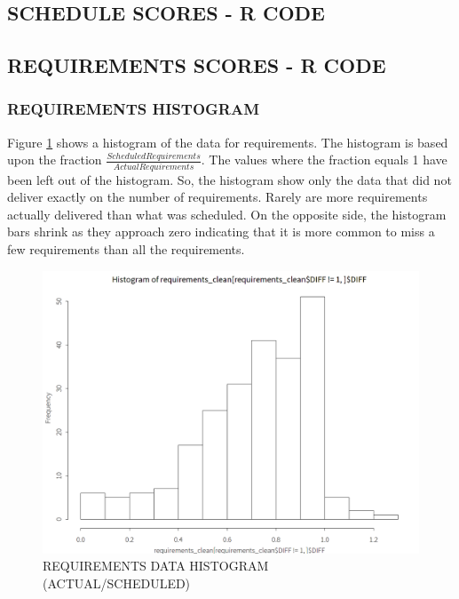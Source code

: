 \documentclass[SDSUThesis.tex]{subfiles}
\begin{document}
    \subsection{SCHEDULE SCORES - R CODE}
        
        
    \subsection{REQUIREMENTS SCORES - R CODE}
        \subsubsection{REQUIREMENTS HISTOGRAM}
        \label{app:requirements-hist}
            Figure \ref{fig:req-hist} shows a histogram of the data
            for requirements.  The histogram is based upon the
            fraction $\frac{Scheduled Requirements}{Actual Requirements}$. The
            values where the fraction equals 1 have been left out of the histogram.
            So, the histogram show only the data that did not deliver exactly
            on the number of requirements. Rarely are more requirements actually 
            delivered than what was scheduled.  On the opposite side, the histogram
            bars shrink as they approach zero indicating that it is more common
            to miss a few requirements than all the requirements.
            
            \begin{figure}[ht]
                \centering
                \includegraphics[scale=.3]{images/req_hist.png}
                \caption{REQUIREMENTS DATA HISTOGRAM (ACTUAL/SCHEDULED)}
                \label{fig:req-hist}
            \end{figure}
        
\end{document}
